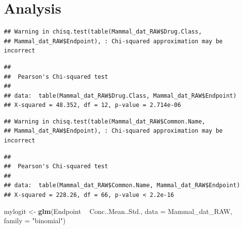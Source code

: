\documentclass[12pt,]{article}
\newenvironment{Shaded}{\begin{snugshade}}{\end{snugshade}}
\newcommand{\KeywordTok}[1]{\textcolor[rgb]{0.13,0.29,0.53}{\textbf{#1}}}
\newcommand{\DataTypeTok}[1]{\textcolor[rgb]{0.13,0.29,0.53}{#1}}
\newcommand{\StringTok}[1]{\textcolor[rgb]{0.31,0.60,0.02}{#1}}
\newcommand{\OtherTok}[1]{\textcolor[rgb]{0.56,0.35,0.01}{#1}}
\newcommand{\OperatorTok}[1]{\textcolor[rgb]{0.81,0.36,0.00}{\textbf{#1}}}
\newcommand{\NormalTok}[1]{#1}
\begin{document}
\newpage

\section{Analysis}\label{analysis}

\begin{Shaded}
\end{Shaded}

\begin{verbatim}
## Warning in chisq.test(table(Mammal_dat_RAW$Drug.Class,
## Mammal_dat_RAW$Endpoint), : Chi-squared approximation may be incorrect
\end{verbatim}

\begin{verbatim}
## 
##  Pearson's Chi-squared test
## 
## data:  table(Mammal_dat_RAW$Drug.Class, Mammal_dat_RAW$Endpoint)
## X-squared = 48.352, df = 12, p-value = 2.714e-06
\end{verbatim}

\begin{Shaded}
\end{Shaded}

\begin{verbatim}
## Warning in chisq.test(table(Mammal_dat_RAW$Common.Name,
## Mammal_dat_RAW$Endpoint), : Chi-squared approximation may be incorrect
\end{verbatim}

\begin{verbatim}
## 
##  Pearson's Chi-squared test
## 
## data:  table(Mammal_dat_RAW$Common.Name, Mammal_dat_RAW$Endpoint)
## X-squared = 228.26, df = 66, p-value < 2.2e-16
\end{verbatim}

\begin{Shaded}
\begin{Highlighting}[]
\NormalTok{mylogit <-}\StringTok{ }\KeywordTok{glm}\NormalTok{(Endpoint }\OperatorTok{~}\StringTok{ }\NormalTok{Conc..Mean..Std., }\DataTypeTok{data =}\NormalTok{ Mammal_dat_RAW, }\DataTypeTok{family =} \StringTok{"binomial"}\NormalTok{)}
\end{Highlighting}
\end{Shaded}
\end{document}
